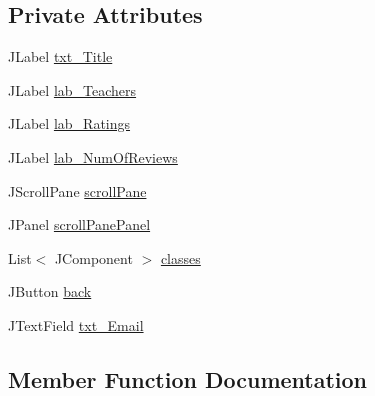 \subsection*{Private Attributes}
\begin{DoxyCompactItemize}
\item 
J\+Label \mbox{\hyperlink{classcom_1_1_b_n_u_1_1pages_1_1teachers_by_class_1_1_teachers_by_class_model_a9fe5e127058b969dc4c805fba5bf30d3}{txt\+\_\+\+Title}}
\item 
J\+Label \mbox{\hyperlink{classcom_1_1_b_n_u_1_1pages_1_1teachers_by_class_1_1_teachers_by_class_model_abe153dd7f18bdeeb0085d2727a4ec106}{lab\+\_\+\+Teachers}}
\item 
J\+Label \mbox{\hyperlink{classcom_1_1_b_n_u_1_1pages_1_1teachers_by_class_1_1_teachers_by_class_model_a82200720196a8d25d4d3cf36686124e9}{lab\+\_\+\+Ratings}}
\item 
J\+Label \mbox{\hyperlink{classcom_1_1_b_n_u_1_1pages_1_1teachers_by_class_1_1_teachers_by_class_model_ac500371a3a76517cf489c8ff04bf5d81}{lab\+\_\+\+Num\+Of\+Reviews}}
\item 
J\+Scroll\+Pane \mbox{\hyperlink{classcom_1_1_b_n_u_1_1pages_1_1teachers_by_class_1_1_teachers_by_class_model_a67acaf6bbdd531904029d4e6e311d736}{scroll\+Pane}}
\item 
J\+Panel \mbox{\hyperlink{classcom_1_1_b_n_u_1_1pages_1_1teachers_by_class_1_1_teachers_by_class_model_a1a99e5343b2c1f92e04b5c2cc069579b}{scroll\+Pane\+Panel}}
\item 
List$<$ J\+Component $>$ \mbox{\hyperlink{classcom_1_1_b_n_u_1_1pages_1_1teachers_by_class_1_1_teachers_by_class_model_ab9faabdfcccfcf99a2a10593ee3ed5ea}{classes}}
\item 
J\+Button \mbox{\hyperlink{classcom_1_1_b_n_u_1_1pages_1_1teachers_by_class_1_1_teachers_by_class_model_a94341f36d35cce6ecc34f1047df8a5ea}{back}}
\item 
J\+Text\+Field \mbox{\hyperlink{classcom_1_1_b_n_u_1_1pages_1_1teachers_by_class_1_1_teachers_by_class_model_aa5298536926c14d3ea0221e2a75f5775}{txt\+\_\+\+Email}}
\end{DoxyCompactItemize}


\subsection{Member Function Documentation}
\mbox{\label{classcom_1_1_b_n_u_1_1pages_1_1teachers_by_class_1_1_teachers_by_class_model_a8fead79d15354df3cdc8af59d5a5a906}} 
